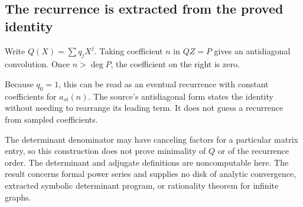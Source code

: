 \subsection{The recurrence is extracted from the proved identity}

Write $Q(X)=\sum q_jX^j$. Taking coefficient $n$ in $QZ=P$ gives an antidiagonal convolution. Once $n>\deg P$, the coefficient on the right is zero.

Because $q_0=1$, this can be read as an eventual recurrence with constant coefficients for $a_{st}(n)$. The source's antidiagonal form states the identity without needing to rearrange its leading term. It does not guess a recurrence from sampled coefficients.

The determinant denominator may have canceling factors for a particular matrix entry, so this construction does not prove minimality of $Q$ or of the recurrence order. The determinant and adjugate definitions are noncomputable here. The result concerns formal power series and supplies no disk of analytic convergence, extracted symbolic determinant program, or rationality theorem for infinite graphs.

